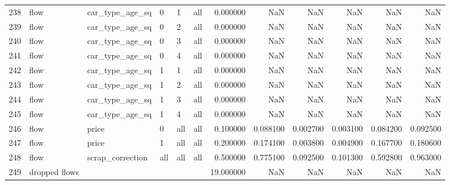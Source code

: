 \begin{tabular}{llllllrrrrrr}
238 & flow & car_type_age_sq & 0 & 1 & all & 0.000000 & NaN & NaN & NaN & NaN & NaN \\
239 & flow & car_type_age_sq & 0 & 2 & all & 0.000000 & NaN & NaN & NaN & NaN & NaN \\
240 & flow & car_type_age_sq & 0 & 3 & all & 0.000000 & NaN & NaN & NaN & NaN & NaN \\
241 & flow & car_type_age_sq & 0 & 4 & all & 0.000000 & NaN & NaN & NaN & NaN & NaN \\
242 & flow & car_type_age_sq & 1 & 1 & all & 0.000000 & NaN & NaN & NaN & NaN & NaN \\
243 & flow & car_type_age_sq & 1 & 2 & all & 0.000000 & NaN & NaN & NaN & NaN & NaN \\
244 & flow & car_type_age_sq & 1 & 3 & all & 0.000000 & NaN & NaN & NaN & NaN & NaN \\
245 & flow & car_type_age_sq & 1 & 4 & all & 0.000000 & NaN & NaN & NaN & NaN & NaN \\
246 & flow & price & 0 & all & all & 0.100000 & 0.088100 & 0.002700 & 0.003100 & 0.084200 & 0.092500 \\
247 & flow & price & 1 & all & all & 0.200000 & 0.174100 & 0.003800 & 0.004900 & 0.167700 & 0.180600 \\
248 & flow & scrap_correction & all & all & all & 0.500000 & 0.775100 & 0.092500 & 0.101300 & 0.592800 & 0.963000 \\
249 & dropped flows &  &  &  &  & 19.000000 & NaN & NaN & NaN & NaN & NaN \\
\bottomrule
\end{tabular}
